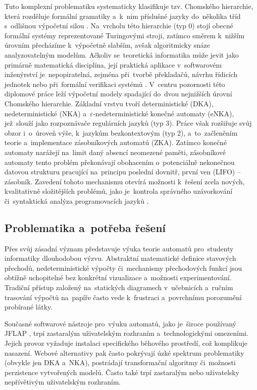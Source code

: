 \documentclass[
  master,
  program=ainfvs,
  printversion,
  figures=false,
  tables=false,
  glossaries,
  index
]{kidiplom}
\begin{document}
Tuto komplexní problematiku systematicky klasifikuje tzv. Chomského hierarchie, která rozděluje formální gramatiky a~k~nim příslušné jazyky do~několika tříd s~odlišnou výpočetní silou \cite{jancar_ti,cerna_fja}. Na~vrcholu této hierarchie (typ 0) stojí obecné formální systémy reprezentované Turingovými stroji, zatímco směrem k~nižším úrovním přecházíme k~výpočetně slabším, avšak algoritmicky snáze analyzovatelným modelům. Ačkoliv se~teoretická informatika může jevit jako primárně matematická disciplína, její praktická aplikace v~softwarovém inženýrství je~nepopiratelná, zejména při~tvorbě překladačů, návrhu řídicích jednotek nebo při~formální verifikaci systémů \cite[kapitola~Úvod]{jancar_ti}.
V~centru pozornosti této diplomové práce leží výpočetní modely spadající do~dvou nejnižších úrovní Chomského hierarchie. Základní vrstvu tvoří deterministické (\gls{DKA}), nedeterministické (\gls{NKA}) a~$\varepsilon$-nedeterministické konečné automaty (\gls{eNKA}), jež~slouží jako rozpoznávače regulárních jazyků (typ 3). Práce však rozšiřuje svůj obzor i~o~úroveň výše, k~jazykům bezkontextovým (typ 2), a~to~začleněním teorie a~implementace zásobníkových automatů (\gls{ZKA}). Zatímco konečné automaty narážejí na~limit daný absencí neomezené paměti, zásobníkové automaty tento problém překonávají obohacením o~potenciálně nekonečnou datovou strukturu pracující na~principu poslední dovnitř, první ven (LIFO) – zásobník. Zavedení tohoto mechanismu otevírá možnosti k~řešení zcela nových, kvalitativně složitějších problémů, jako je~kontrola správného uzávorkování či~syntaktická analýza programovacích jazyků \cite[kapitola~4.5]{jancar_ti}.

\subsection{Problematika a~potřeba řešení}
Přes svůj zásadní význam představuje výuka teorie automatů pro~studenty informatiky dlouhodobou výzvu. Abstraktní matematické definice stavových přechodů, nedeterministické výpočty či~mechanismy přechodových funkcí jsou obtížně uchopitelné bez konkrétní vizualizace a~možnosti experimentování. Tradiční přístup založený na~statických diagramech v~učebnicích a~ručním trasování výpočtů na~papíře často vede k~frustraci a~povrchnímu porozumění probírané látky.

Současné softwarové nástroje pro~výuku automatů, jako je~široce používaný JFLAP \cite{jflap}, trpí zastaralým uživatelským rozhraním a~technologickými omezeními. Jejich provoz vyžaduje instalaci specifického běhového prostředí, což komplikuje nasazení. Webové alternativy pak často pokrývají úzké spektrum problematiky (obvykle jen \gls{DKA} a~\gls{NKA}), postrádají transformační algoritmy či~možnosti perzistence vytvořených modelů. Často také trpí zastaralým nebo uživatelsky nepřívětivým uživatelským rozhraním.
\end{document}
